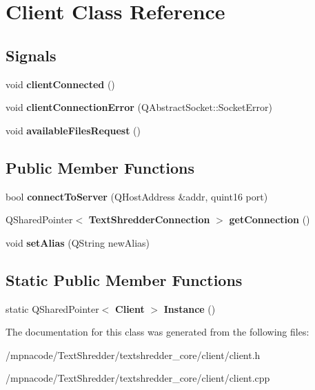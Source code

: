 \section{Client Class Reference}
\label{class_client}
\subsection*{Signals}
\begin{DoxyCompactItemize}
\item 
void {\bfseries clientConnected} ()\label{class_client_a9ce3a42731df631923c830cad7fdd3a9}

\item 
void {\bfseries clientConnectionError} (QAbstractSocket::SocketError)\label{class_client_a01cb1f3d745c830e77513e56bb30465c}

\item 
void {\bfseries availableFilesRequest} ()\label{class_client_a1390021ee4d8190c5372df480e8d3949}

\end{DoxyCompactItemize}
\subsection*{Public Member Functions}
\begin{DoxyCompactItemize}
\item 
bool {\bfseries connectToServer} (QHostAddress \&addr, quint16 port)\label{class_client_a9ece2ab35718491266ca7d807d1ec963}

\item 
QSharedPointer$<$ {\bf TextShredderConnection} $>$ {\bfseries getConnection} ()\label{class_client_a9fa7845f7bb959609337128fd01830ba}

\item 
void {\bfseries setAlias} (QString newAlias)\label{class_client_a4675bd71963582698fcc2ac0c4bf64f9}

\end{DoxyCompactItemize}
\subsection*{Static Public Member Functions}
\begin{DoxyCompactItemize}
\item 
static QSharedPointer$<$ {\bf Client} $>$ {\bfseries Instance} ()\label{class_client_a34475d4f810658aa0c748497eca1b10d}

\end{DoxyCompactItemize}


The documentation for this class was generated from the following files:\begin{DoxyCompactItemize}
\item 
/mpnacode/TextShredder/textshredder\_\-core/client/client.h\item 
/mpnacode/TextShredder/textshredder\_\-core/client/client.cpp\end{DoxyCompactItemize}
